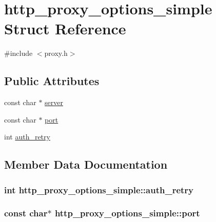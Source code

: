\hypertarget{structhttp__proxy__options__simple}{}\section{http\+\_\+proxy\+\_\+options\+\_\+simple Struct Reference}
\label{structhttp__proxy__options__simple}


{\ttfamily \#include $<$proxy.\+h$>$}

\subsection*{Public Attributes}
\begin{DoxyCompactItemize}
\item 
const char $\ast$ \hyperlink{structhttp__proxy__options__simple_af1518741b860c746e024778cc0e880da}{server}
\item 
const char $\ast$ \hyperlink{structhttp__proxy__options__simple_a19441c493ba5d9757ec88cbef455e7a9}{port}
\item 
int \hyperlink{structhttp__proxy__options__simple_ae0d575735601220c10d4e9508766a7c0}{auth\+\_\+retry}
\end{DoxyCompactItemize}


\subsection{Member Data Documentation}
\hypertarget{structhttp__proxy__options__simple_ae0d575735601220c10d4e9508766a7c0}{}
\subsubsection[{auth\+\_\+retry}]{\setlength{\rightskip}{0pt plus 5cm}int http\+\_\+proxy\+\_\+options\+\_\+simple\+::auth\+\_\+retry}\label{structhttp__proxy__options__simple_ae0d575735601220c10d4e9508766a7c0}
\hypertarget{structhttp__proxy__options__simple_a19441c493ba5d9757ec88cbef455e7a9}{}
\subsubsection[{port}]{\setlength{\rightskip}{0pt plus 5cm}const char$\ast$ http\+\_\+proxy\+\_\+options\+\_\+simple\+::port}\label{structhttp__proxy__options__simple_a19441c493ba5d9757ec88cbef455e7a9}
\hypertarget{structhttp__proxy__options__simple_af1518741b860c746e024778cc0e880da}{}
